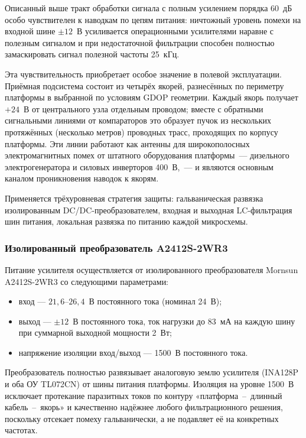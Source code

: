 \documentclass[a4paper,11pt]{article} %
\begin{document}
Описанный выше тракт обработки сигнала с полным усилением порядка 60~дБ
особо чувствителен к наводкам по цепям питания: ничтожный уровень помехи на входной
шине $\pm 12$~В усиливается операционными усилителями наравне с полезным сигналом
и при недостаточной фильтрации способен полностью замаскировать сигнал
полезной частоты 25~кГц.

Эта чувствительность приобретает особое значение в полевой эксплуатации.
Приёмная подсистема состоит из четырёх якорей, разнесённых по периметру платформы
в выбранной по условиям GDOP геометрии. Каждый якорь получает $+24$~В от центрального
узла отдельным проводом; вместе с обратными сигнальными линиями от компараторов
это образует пучок из нескольких протяжённых (несколько метров) проводных трасс,
проходящих по корпусу платформы.
Эти линии работают как антенны для широкополосных электромагнитных помех
от штатного оборудования платформы~--- дизельного электрогенератора и силовых
инверторов 400~В,~--- и являются основным каналом проникновения наводок к якорям.

Применяется трёхуровневая стратегия защиты: гальваническая развязка изолированным
DC/DC-преобразователем, входная и выходная LC-фильтрация шин питания, локальная развязка
по питанию каждой микросхемы.

\subsubsection{Изолированный преобразователь A2412S-2WR3}

Питание усилителя осуществляется от изолированного преобразователя Mornsun A2412S-2WR3
со следующими параметрами:
\begin{itemize}
    \item вход --- $21{,}6\text{--}26{,}4$~В постоянного тока (номинал 24~В);
    \item выход --- $\pm 12$~В постоянного тока, ток нагрузки до 83~мА на каждую шину
          при суммарной выходной мощности 2~Вт;
    \item напряжение изоляции вход/выход --- 1500~В постоянного тока.
\end{itemize}

Преобразователь полностью развязывает аналоговую землю усилителя (INA128P и оба ОУ
TL072CN) от шины питания платформы. Изоляция на уровне 1500~В исключает протекание
паразитных токов по контуру «платформа~--~длинный кабель~--~якорь» и качественно
надёжнее любого фильтрационного решения, поскольку отсекает помеху гальванически,
а не подавляет её на конкретных частотах.
\end{document}
